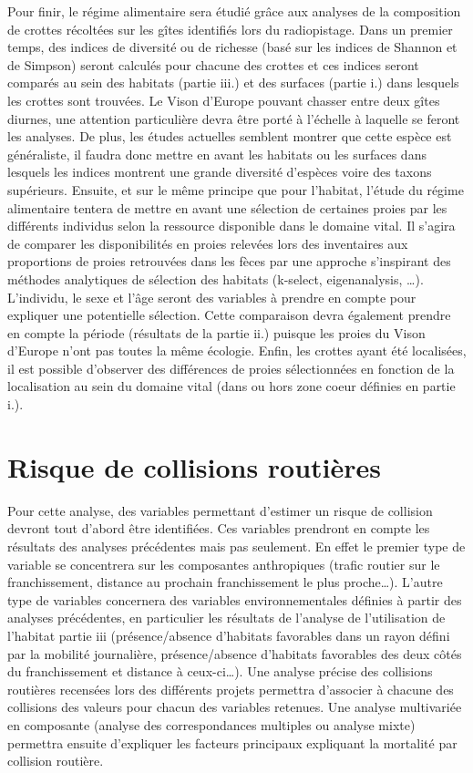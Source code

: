 \documentclass[
  letterpaper,
  DIV=11,
  numbers=noendperiod]{scrreprt}
\begin{document}
Pour finir, le régime alimentaire sera étudié grâce aux analyses de la
composition de crottes récoltées sur les gîtes identifiés lors du
radiopistage. Dans un premier temps, des indices de diversité ou de
richesse (basé sur les indices de Shannon et de Simpson) seront calculés
pour chacune des crottes et ces indices seront comparés au sein des
habitats (partie iii.) et des surfaces (partie i.) dans lesquels les
crottes sont trouvées. Le Vison d'Europe pouvant chasser entre deux
gîtes diurnes, une attention particulière devra être porté à l'échelle à
laquelle se feront les analyses. De plus, les études actuelles semblent
montrer que cette espèce est généraliste, il faudra donc mettre en avant
les habitats ou les surfaces dans lesquels les indices montrent une
grande diversité d'espèces voire des taxons supérieurs. Ensuite, et sur
le même principe que pour l'habitat, l'étude du régime alimentaire
tentera de mettre en avant une sélection de certaines proies par les
différents individus selon la ressource disponible dans le domaine
vital. Il s'agira de comparer les disponibilités en proies relevées lors
des inventaires aux proportions de proies retrouvées dans les fèces par
une approche s'inspirant des méthodes analytiques de sélection des
habitats (k-select, eigenanalysis, \ldots). L'individu, le sexe et l'âge
seront des variables à prendre en compte pour expliquer une potentielle
sélection. Cette comparaison devra également prendre en compte la
période (résultats de la partie ii.) puisque les proies du Vison
d'Europe n'ont pas toutes la même écologie. Enfin, les crottes ayant été
localisées, il est possible d'observer des différences de proies
sélectionnées en fonction de la localisation au sein du domaine vital
(dans ou hors zone coeur définies en partie i.).

\section{Risque de collisions
routières}\label{risque-de-collisions-routiuxe8res}

Pour cette analyse, des variables permettant d'estimer un risque de
collision devront tout d'abord être identifiées. Ces variables prendront
en compte les résultats des analyses précédentes mais pas seulement. En
effet le premier type de variable se concentrera sur les composantes
anthropiques (trafic routier sur le franchissement, distance au prochain
franchissement le plus proche\ldots). L'autre type de variables
concernera des variables environnementales définies à partir des
analyses précédentes, en particulier les résultats de l'analyse de
l'utilisation de l'habitat partie iii (présence/absence d'habitats
favorables dans un rayon défini par la mobilité journalière,
présence/absence d'habitats favorables des deux côtés du franchissement
et distance à ceux-ci\ldots). Une analyse précise des collisions
routières recensées lors des différents projets permettra d'associer à
chacune des collisions des valeurs pour chacun des variables retenues.
Une analyse multivariée en composante (analyse des correspondances
multiples ou analyse mixte) permettra ensuite d'expliquer les facteurs
principaux expliquant la mortalité par collision routière.
\end{document}
